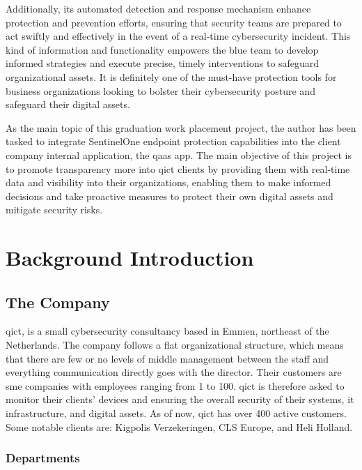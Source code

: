 Additionally, its automated detection and response mechanism enhance protection and prevention efforts, ensuring that security teams
are prepared to act swiftly and effectively in the event of a real-time cybersecurity incident. This kind of information and functionality
empowers the blue team to develop informed strategies and execute precise, timely interventions to safeguard organizational assets. It is
definitely one of the must-have protection tools for business organizations looking to bolster their cybersecurity posture
and safeguard their digital assets.

As the main topic of this graduation work placement project, the author
has been tasked to integrate SentinelOne endpoint protection capabilities into the client company internal
application, the \acrshort{qaas} app. The main objective of this project is to promote transparency more
into \acrshort{qict} clients by providing them with real-time data and visibility into their organizations,
enabling them to make informed decisions and take proactive measures to protect their own digital assets and
mitigate security risks.

\section{Background Introduction}

\subsection{The Company}

\acrshort{qict}, is a small cybersecurity consultancy based in Emmen, northeast of the Netherlands. The company follows
a flat organizational structure, which means that there are few or no levels of middle management between the staff and
everything communication directly goes with the director. Their customers are \acrshort{sme} companies with employees ranging
from 1 to 100. \acrshort{qict} is therefore asked to monitor their clients' devices and ensuring the overall security of their
systems, \acrshort{it} infrastructure, and digital assets. As of now, \acrshort{qict} has over 400 active customers. Some notable clients
are: Kigpolis Verzekeringen, CLS Europe, and Heli Holland.

\subsubsection{Departments}

